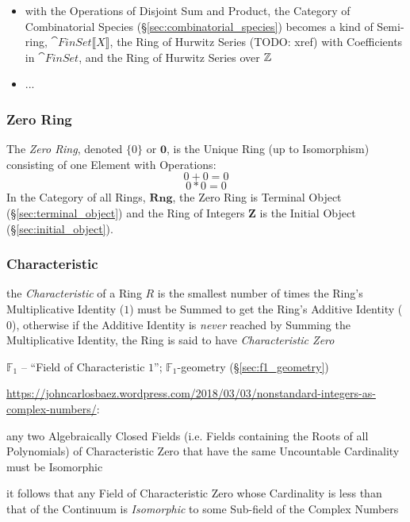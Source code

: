 \begin{itemize}
  \item with the Operations of Disjoint Sum and Product, the
    Category of Combinatorial Species (\S\ref{sec:combinatorial_species})
    becomes a kind of Semi-ring, $\cat{FinSet}\llbracket{X}\rrbracket$, the
    Ring of Hurwitz Series (TODO: xref) with Coefficients in $\cat{FinSet}$, and
    the Ring of Hurwitz Series over $\mathbb{Z}$
  \item ...
\end{itemize}



\subsubsection{Zero Ring}\label{sec:zero_ring}

The \emph{Zero Ring}, denoted $\{0\}$ or $\mathbf{0}$, is the Unique Ring
(up to Isomorphism) consisting of one Element with Operations:
\[
    0 + 0 = 0
\] \[
    0 * 0 = 0
\]
In the Category of all Rings, $\mathbf{Rng}$, the Zero Ring is
Terminal Object (\S\ref{sec:terminal_object}) and the Ring of Integers
$\mathbf{Z}$ is the Initial Object (\S\ref{sec:initial_object}).



\subsubsection{Characteristic}\label{sec:ring_characteristic}

the \emph{Characteristic} of a Ring $R$ is the smallest number of times the
Ring's Multiplicative Identity ($1$) must be Summed to get the Ring's Additive
Identity ($0$), otherwise if the Additive Identity is \emph{never} reached by
Summing the Multiplicative Identity, the Ring is said to have
\emph{Characteristic Zero}

\fist $\mathbb{F}_1$ -- ``Field of Characteristic $1$''; $\mathbb{F}_1$-geometry
(\S\ref{sec:f1_geometry})

\url{https://johncarlosbaez.wordpress.com/2018/03/03/nonstandard-integers-as-complex-numbers/}:

any two Algebraically Closed Fields (i.e. Fields containing the Roots of all
Polynomials) of Characteristic Zero that have the same Uncountable Cardinality
must be Isomorphic

it follows that any Field of Characteristic Zero whose Cardinality is less than
that of the Continuum is \emph{Isomorphic} to some Sub-field of the Complex
Numbers



